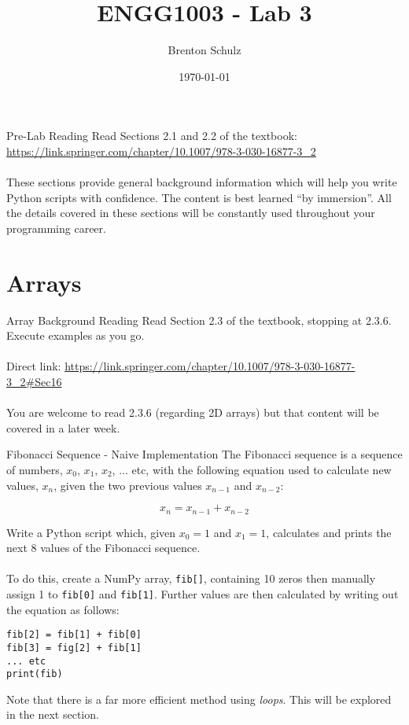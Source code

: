 \documentclass{lab}
\title{ENGG1003 - Lab 3}
\author{Brenton Schulz}
\date{\today}
\begin{document}
\maketitle

\begin{task}{Pre-Lab Reading}{}
Read Sections 2.1 and 2.2 of the textbook: \url{https://link.springer.com/chapter/10.1007/978-3-030-16877-3_2}
\\~\\
These sections provide general background information which will help you write Python scripts with confidence. The content is best learned ``by immersion''. All the details covered in these sections will be constantly used throughout your programming career.
\end{task}

\section{Arrays}

\begin{task}{Array Background Reading}{}
Read Section 2.3 of the textbook, stopping at 2.3.6. Execute examples as you go.
\\~\\
Direct link: \url{https://link.springer.com/chapter/10.1007/978-3-030-16877-3_2#Sec16}
\\~\\
You are welcome to read 2.3.6 (regarding 2D arrays) but that content will be covered in a later week.
\end{task}

\begin{task}{Fibonacci  Sequence - Naive Implementation}{}
The Fibonacci sequence is a sequence of numbers, $x_0$, $x_1$, $x_2$, ... etc, with the following equation used to calculate new values, $x_n$, given the two previous values $x_{n-1}$ and $x_{n-2}$:

\begin{equation}\label{eq:fib}
x_n = x_{n-1} + x_{n-2}
\end{equation}

Write a Python script which, given $x_0=1$ and $x_1=1$, calculates and prints the next 8 values of the Fibonacci sequence.
\\~\\
To do this, create a NumPy array, \texttt{fib[]}, containing 10 zeros then manually assign 1 to \texttt{fib[0]} and \texttt{fib[1]}. Further values are then calculated by writing out the equation as follows:
\begin{lstlisting}
fib[2] = fib[1] + fib[0]
fib[3] = fig[2] + fib[1]
... etc
print(fib)
\end{lstlisting}

Note that there is a far more efficient method using \textit{loops}. This will be explored in the next section.
\end{task}
\end{document}
